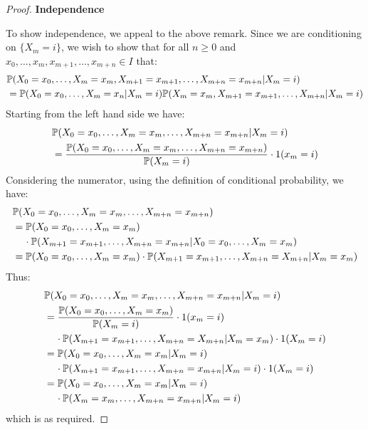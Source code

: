 \documentclass[../main.tex]{subfiles}
\begin{document}
\begin{proof}
  \textbf{Independence}\par
  To show independence, we appeal to the above remark.
  Since we are conditioning on $\{X_m = i\}$, we wish to show that for all $n \geq 0$ and $x_0, \ldots, x_m, x_{m + 1}, \ldots, x_{m + n} \in I$ that:
  \begin{align*}
    &\P(X_0 = x_0, \ldots, X_m = x_m, X_{m + 1} = x_{m + 1}, \ldots, X_{m + n} = x_{m + n} \vert X_m = i) \\
    &= \P(X_0 = x_0, \ldots, X_m = x_n \vert X_m = i)\P(X_m = x_m, X_{m + 1} = x_{m + 1}, \ldots, X_{m + n} \vert X_m = i)
  \end{align*}
  Starting from the left hand side we have:
  \begin{align*}
    &\P(X_0 = x_0, \ldots, X_m = x_m, \ldots, X_{m + n} = x_{m + n} \vert X_m = i) \\
    &= \frac{\P(X_0 = x_0, \ldots, X_m = x_m, \ldots, X_{m + n} = x_{m + n})}{\P(X_m = i)} \cdot 1(x_m = i)
  \end{align*}
  Considering the numerator, using the definition of conditional probability, we have:
  \begin{align*}
    &\P(X_0 = x_0, \ldots, X_m = x_m, \ldots, X_{m + n} = x_{m + n}) \\
    &= \P(X_0 = x_0, \ldots, X_m = x_m) \\
    &\hspace{0.4cm} \cdot \P(X_{m + 1} = x_{m + 1}, \ldots, X_{m + n} = x_{m + n} \vert X_0 = x_0, \ldots, X_m = x_m) \\
    &= \P(X_0 = x_0, \ldots, X_m = x_m) \cdot \P(X_{m + 1} = x_{m + 1}, \ldots, X_{m + n} = X_{m + n} \vert X_m = x_m)
  \end{align*}
  Thus:
  \begin{align*}
    &\P(X_0 = x_0, \ldots, X_m = x_m, \ldots, X_{m + n} = x_{m + n} \vert X_m = i) \\
    &= \frac{\P(X_0 = x_0, \ldots, X_m = x_m)}{\P(X_m = i)} \cdot 1(x_m = i) \\
    &\hspace{0.4cm} \cdot \P(X_{m + 1} = x_{m + 1}, \ldots, X_{m + n} = X_{m + n} \vert X_m = x_m) \cdot 1(X_m = i) \\
    &= \P(X_0 = x_0, \ldots, X_m = x_m \vert X_m = i) \\
    &\hspace{0.4cm} \cdot \P(X_{m + 1} = x_{m + 1}, \ldots, X_{m + n} = x_{m + n} \vert X_m = i) \cdot 1(X_m = i) \\
    &= \P(X_0 = x_0, \ldots, X_m = x_m \vert X_m = i) \\
    &\hspace{0.4cm} \cdot \P(X_m = x_m, \ldots, X_{m + n} = x_{m + n} \vert X_m = i)
  \end{align*}
  which is as required.
\end{proof}
\end{document}
